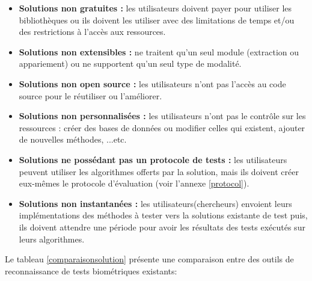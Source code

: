 \begin{itemize}
	\item \textbf{Solutions non gratuites :} les utilisateurs doivent payer pour utiliser les bibliothèques ou ils doivent les utiliser avec des limitations de temps et/ou des restrictions à l'accès aux ressources.
	\item \textbf{Solutions non extensibles :} ne traitent qu'un seul module (extraction ou appariement) ou ne supportent qu'un seul type de modalité.
	
	\item \textbf{Solutions non open source :} les utilisateurs n'ont pas l'accès au code source pour le réutiliser ou l'améliorer.
	
	\item \textbf{Solutions non personnalisées :} les utilisateurs n’ont pas le contrôle sur les ressources : créer des bases de données ou modifier celles qui existent, ajouter de nouvelles méthodes, ...etc.
	
	\item \textbf{Solutions ne possédant pas un protocole de tests :} les utilisateurs peuvent utiliser les algorithmes offerts par la solution, mais ils doivent créer eux-mêmes le protocole d'évaluation (voir l'annexe \ref{protocol}).
	
	\item \textbf{Solutions non instantanées :} les utilisateurs(chercheurs) envoient leurs implémentations des méthodes à tester vers la solutions existante de test puis, ils doivent attendre une période pour avoir les résultats des tests exécutés sur leurs algorithmes.
\end{itemize}
Le tableau \ref{comparaisonsolution} présente une comparaison entre des outils de reconnaissance de tests biométriques existants:
